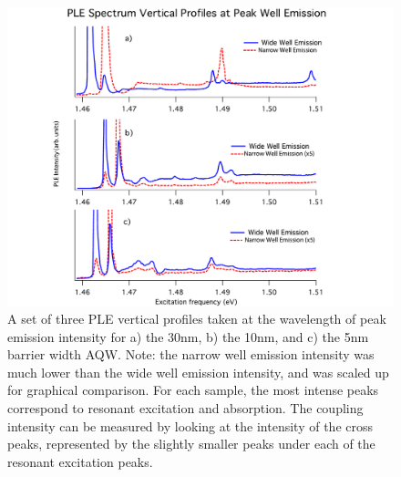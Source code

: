 \begin{figure}
\centering
\includegraphics[width = 1.1\textwidth]{Layout2.pdf}
\caption{ \doublespacing A set of three PLE vertical profiles taken at the wavelength of peak emission intensity for a) the 30nm, b) the 10nm, and c) the 5nm barrier width AQW. Note: the narrow well emission intensity was much lower than the wide well emission intensity, and was scaled up for graphical comparison. For each sample, the most intense peaks correspond to resonant excitation and absorption. The coupling intensity can be measured by looking at the intensity of the cross peaks, represented by the slightly smaller peaks under each of the resonant excitation peaks.} 
\label{traces}
\end{figure}
